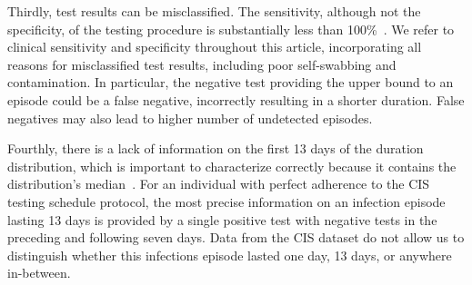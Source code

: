 \documentclass[referee,useAMS,usenatbib]{biom}
\begin{document}
Thirdly, test results can be misclassified.
The sensitivity, although not the specificity, of the testing procedure is substantially less than 100\%~\citep{cisMethodsONS}.
We refer to clinical sensitivity and specificity throughout this article, incorporating all reasons for misclassified test results, including poor self-swabbing and contamination.
In particular, the negative test providing the upper bound to an episode could be a false negative, incorrectly resulting in a shorter duration.
False negatives may also lead to higher number of undetected episodes.

Fourthly, there is a lack of information on the first 13 days of the duration distribution, which is important to characterize correctly because it contains the distribution's median~\citep{ealesCharacterising,cevikShedding,hellewellPCRSensitivity}.
For an individual with perfect adherence to the CIS testing schedule protocol, the most precise information on an infection episode lasting 13 days is provided by a single positive test with negative tests in the preceding and following seven days.
Data from the CIS dataset do not allow us to distinguish whether this infections episode lasted one day, 13 days, or anywhere in-between.


\end{document}
